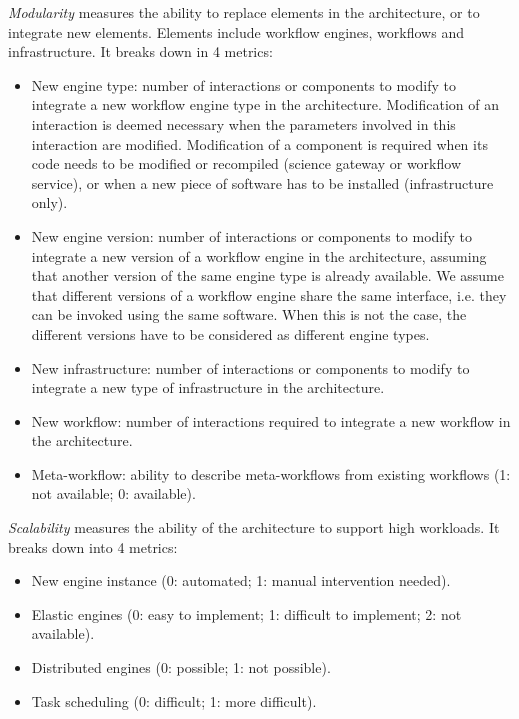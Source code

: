 \documentclass[preprint,3p,twocolumn]{elsarticle}
\begin{document}
\emph{Modularity} measures the ability to replace elements in the
architecture, or to integrate new elements. Elements include
workflow engines, workflows and infrastructure. It breaks down in 4
metrics:
\begin{itemize}[itemsep=0cm]
\item New engine type: number of interactions or components to modify
  to integrate a new workflow engine type in the
  architecture. Modification of an interaction is deemed necessary
  when the parameters involved in this interaction are
  modified. Modification of a component is required when its code
  needs to be modified or recompiled (science gateway or workflow
  service), or when a new piece of software has to be installed
  (infrastructure only).
\item New engine version: number of interactions or components to
  modify to integrate a new version of a workflow engine in the
  architecture, assuming that another version of the same engine type
  is already available. We assume that different versions of a
  workflow engine share the same interface, i.e. they can be invoked
  using the same software. When this is not the case, the different
  versions have to be considered as different engine types.
\item New infrastructure: number of interactions or components to
  modify to integrate a new type of infrastructure in the
  architecture.
\item New workflow: number of interactions required to integrate a new
  workflow in the architecture.
\item Meta-workflow: ability to describe meta-workflows from existing
  workflows (1: not available; 0: available).
\end{itemize}

\emph{Scalability} measures the ability of the architecture to support
high workloads. It breaks down into 4 metrics:
\begin{itemize}[itemsep=0cm]
\item New engine instance (0: automated; 1: manual intervention needed).
\item Elastic engines (0: easy to implement; 1: difficult to
  implement; 2: not available).
\item Distributed engines (0: possible; 1: not possible).
\item Task scheduling (0: difficult; 1: more difficult).
\end{itemize}


\end{document}
